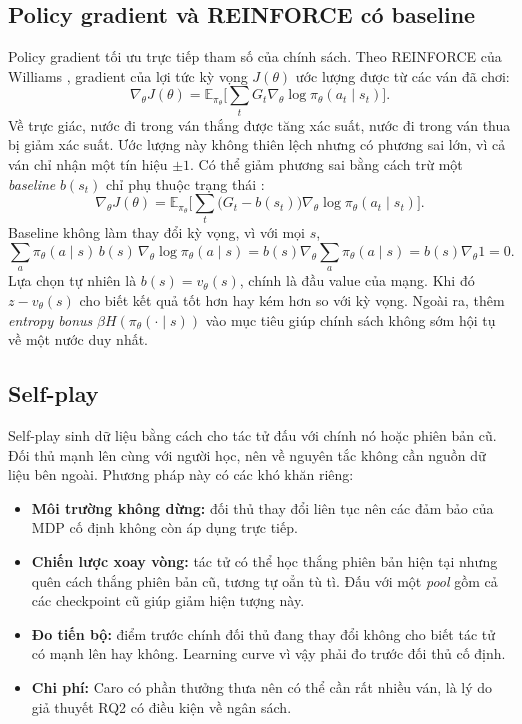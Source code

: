 \subsection{Policy gradient và REINFORCE có baseline}
Policy gradient tối ưu trực tiếp tham số của chính sách. Theo REINFORCE của Williams \cite{williams1992reinforce}, gradient của lợi tức kỳ vọng $J(\theta)$ ước lượng được từ các ván đã chơi:
\begin{equation}
  \nabla_\theta J(\theta) = \mathbb{E}_{\pi_\theta} \Big[ \sum_t G_t \nabla_\theta \log \pi_\theta(a_t \mid s_t) \Big].
\end{equation}
Về trực giác, nước đi trong ván thắng được tăng xác suất, nước đi trong ván thua bị giảm xác suất. Ước lượng này không thiên lệch nhưng có phương sai lớn, vì cả ván chỉ nhận một tín hiệu $\pm 1$. Có thể giảm phương sai bằng cách trừ một \emph{baseline} $b(s_t)$ chỉ phụ thuộc trạng thái \cite{sutton2018rl}:
\begin{equation}
  \nabla_\theta J(\theta) = \mathbb{E}_{\pi_\theta} \Big[ \sum_t \big( G_t - b(s_t) \big) \nabla_\theta \log \pi_\theta(a_t \mid s_t) \Big].
  \label{eq:reinforce}
\end{equation}
Baseline không làm thay đổi kỳ vọng, vì với mọi $s$,
\begin{equation}
  \sum_a \pi_\theta(a \mid s)\, b(s)\, \nabla_\theta \log \pi_\theta(a \mid s) = b(s) \nabla_\theta \sum_a \pi_\theta(a \mid s) = b(s) \nabla_\theta 1 = 0.
\end{equation}
Lựa chọn tự nhiên là $b(s) = v_\theta(s)$, chính là đầu value của mạng. Khi đó $z - v_\theta(s)$ cho biết kết quả tốt hơn hay kém hơn so với kỳ vọng. Ngoài ra, thêm \emph{entropy bonus} $\beta H(\pi_\theta(\cdot \mid s))$ vào mục tiêu giúp chính sách không sớm hội tụ về một nước duy nhất.

\subsection{Self-play}
Self-play sinh dữ liệu bằng cách cho tác tử đấu với chính nó hoặc phiên bản cũ. Đối thủ mạnh lên cùng với người học, nên về nguyên tắc không cần nguồn dữ liệu bên ngoài. Phương pháp này có các khó khăn riêng:
\begin{itemize}
  \item \textbf{Môi trường không dừng:} đối thủ thay đổi liên tục nên các đảm bảo của MDP cố định không còn áp dụng trực tiếp.
  \item \textbf{Chiến lược xoay vòng:} tác tử có thể học thắng phiên bản hiện tại nhưng quên cách thắng phiên bản cũ, tương tự oẳn tù tì. Đấu với một \emph{pool} gồm cả các checkpoint cũ giúp giảm hiện tượng này.
  \item \textbf{Đo tiến bộ:} điểm trước chính đối thủ đang thay đổi không cho biết tác tử có mạnh lên hay không. Learning curve vì vậy phải đo trước đối thủ cố định.
  \item \textbf{Chi phí:} Caro có phần thưởng thưa nên có thể cần rất nhiều ván, là lý do giả thuyết RQ2 có điều kiện về ngân sách.
\end{itemize}

